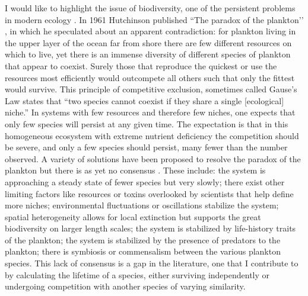 I would like to highlight the issue of biodiversity, one of the persistent problems in modern ecology \cite{May1999,Chesson2000,Pennisi2005,Kelly2008}. %
In 1961 Hutchinson published ``The paradox of the plankton’’ \cite{Hutchinson1961}, in which he speculated about an apparent contradiction: for plankton living in the upper layer of the ocean far from shore there are few different resources on which to live, yet there is an immense diversity of different species of plankton that appear to coexist. 
Surely those that reproduce the quickest or use the resources most efficiently would outcompete all others such that only the fittest would survive. 
This principle of competitive exclusion, sometimes called Gause’s Law \cite{Gause1934} states that ``two species cannot coexist if they share a single [ecological] niche.''
In systems with few resources and therefore few niches, one expects that only few species will persist at any given time.
The expectation is that in this homogeneous ecosystem with extreme nutrient deficiency the competition should be severe, and only a few species should persist, many fewer than the number observed. 
A variety of solutions have been proposed to resolve the paradox of the plankton but there is as yet no consensus \cite{Roy2007}.
These include: the system is approaching a steady state of fewer species but very slowly; there exist other limiting factors like resources or toxins overlooked by scientists that help define more niches; environmental fluctuations or oscillations stabilize the system; spatial heterogeneity allows for local extinction but supports the great biodiversity on larger length scales; the system is stabilized by life-history traits of the plankton; the system is stabilized by the presence of predators to the plankton; there is symbiosis or commensalism between the various plankton species. 
This lack of consensus is a gap in the literature, one that I contribute to by calculating the lifetime of a species, either surviving independently or undergoing competition with another species of varying similarity. 


